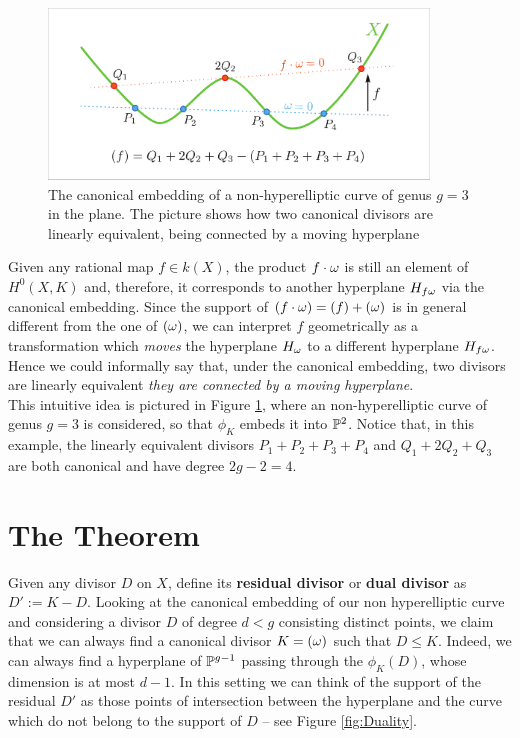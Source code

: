 	\begin{figure}[h]
		\centering
		\includegraphics[width=0.9\textwidth]{canonical_embedding_new.pdf}
		\caption{The canonical embedding of a non-hyperelliptic curve of genus $g=3$ in the plane. The picture shows how two canonical divisors are linearly equivalent, being connected by a moving hyperplane }
		\label{fig:canonical_embedding}
	\end{figure}

	Given any rational map $f\in k(X)$, the product $f\cdot \omega$ is still an element of $H^0(X,K)$ and, therefore, it corresponds to another hyperplane $H_{f\omega}$ via the canonical embedding. Since the support of $(f\cdot\omega) = (f)+(\omega)$ is in general different from the one of $(\omega)$, we can interpret $f$ geometrically as a transformation which \emph{moves} the hyperplane $H_\omega$ to a different hyperplane $H_{f\omega}$.
	Hence we could informally say that, under the canonical embedding, two divisors are linearly equivalent \ABiff \emph{they are connected by a moving hyperplane}. \\

	This intuitive idea is pictured in Figure \ref{fig:canonical_embedding}, where an non-hyperelliptic curve of genus $g=3$ is considered, so that $\phi_K$ embeds it into $\mathbb{P}^2$. Notice that, in this example, the linearly equivalent divisors $P_1+P_2+P_3+P_4$ and $Q_1+2Q_2+Q_3$ are both canonical and have degree $2g-2 = 4$.


\section{The \RR Theorem}

	Given any divisor $D$ on $X$, define its \textbf{residual divisor} or \textbf{dual divisor} as $D' := K-D$. Looking at the canonical embedding of our non hyperelliptic curve and considering a divisor $D$ of degree $d<g$ consisting distinct points, we claim that we can always find a canonical divisor $K=(\omega)$ such that $D\leq K$. Indeed, we can always find a hyperplane of $\mathbb{P}^{g-1}$ passing through the $\phi_K(D)$, whose dimension is at most $d-1$.
	In this setting we can think of the support of the residual $D'$ as those points of intersection between the hyperplane and the curve which do not belong to the support of $D$ -- see Figure \ref{fig:Duality}.\\

